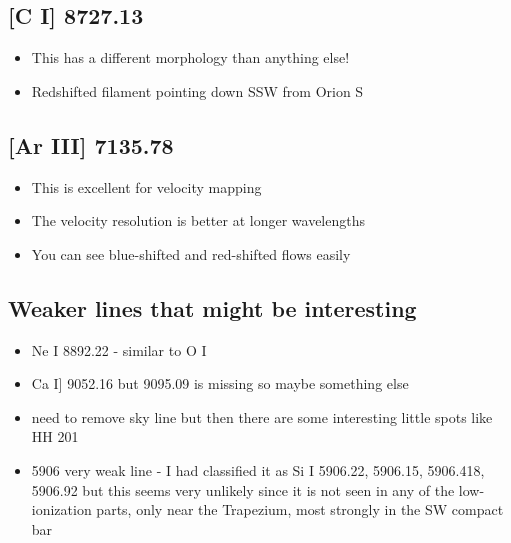 \documentclass[11pt]{article}
\begin{document}
\subsection{[C I] 8727.13}
\label{sec:orgheadline3}
\begin{itemize}
\item This has a different morphology than anything else!
\item Redshifted filament pointing down SSW from Orion S
\end{itemize}
\subsection{[Ar III] 7135.78}
\label{sec:orgheadline4}
\begin{itemize}
\item This is excellent for velocity mapping
\item The velocity resolution is better at longer wavelengths
\item You can see blue-shifted and red-shifted flows easily
\end{itemize}
\subsection{Weaker lines that might be interesting}
\label{sec:orgheadline5}
\begin{itemize}
\item Ne I 8892.22 - similar to O I
\item Ca I] 9052.16 but 9095.09 is missing so maybe something else
\item{} need to remove sky line but then there are some interesting little spots like HH 201
\item 5906 very weak line - I had classified it as Si I 5906.22, 5906.15, 5906.418, 5906.92 but this seems very unlikely since it is not seen in any of the low-ionization parts, only near the Trapezium, most strongly in the SW compact bar
\end{itemize}
\end{document}
